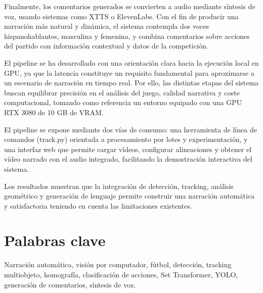 Finalmente, los comentarios generados se convierten a audio mediante síntesis de voz, usando sistemas como XTTS o ElevenLabs. Con el fin de producir una narración más natural y dinámica, el sistema contempla dos voces hispanohablantes, masculina y femenina, y combina comentarios sobre acciones del partido con información contextual y datos de la competición.

El pipeline se ha desarrollado con una orientación clara hacia la ejecución local en GPU, ya que la latencia constituye un requisito fundamental para aproximarse a un escenario de narración en tiempo real. Por ello, las distintas etapas del sistema buscan equilibrar precisión en el análisis del juego, calidad narrativa y coste computacional, tomando como referencia un entorno equipado con una GPU RTX 3080 de 10 GB de VRAM.

El pipeline se expone mediante dos vías de consumo: una herramienta de línea de comandos (track.py) orientada a procesamiento por lotes y experimentación, y una interfaz web que permite cargar vídeos, configurar alineaciones y obtener el vídeo narrado con el audio integrado, facilitando la demostración interactiva del sistema.

Los resultados muestran que la integración de detección, tracking, análisis geométrico y generación de lenguaje permite construir una narración automática y satisfactoria teniendo en cuenta las limitaciones existentes.

\section*{Palabras clave}

\noindent Narración automática, visión por computador, fútbol, detección, tracking multiobjeto, homografía, clasificación de acciones, Set Transformer, YOLO, generación de comentarios, síntesis de voz.

   
